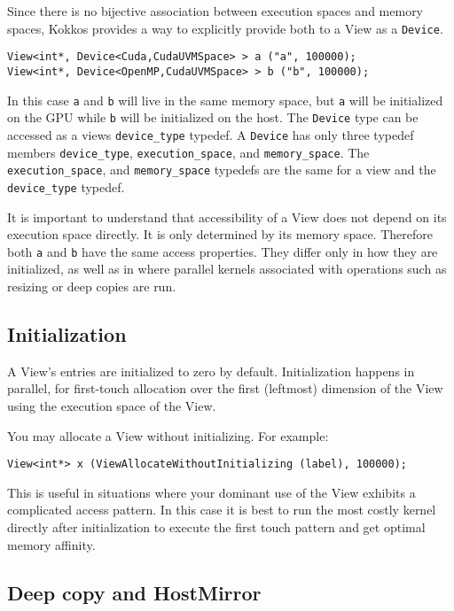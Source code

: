 Since there is no bijective association between execution spaces and memory 
spaces, Kokkos provides a way to explicitly provide both to a View as a 
\lstinline|Device|. 
\begin{lstlisting}
View<int*, Device<Cuda,CudaUVMSpace> > a ("a", 100000);
View<int*, Device<OpenMP,CudaUVMSpace> > b ("b", 100000);
\end{lstlisting}
In this case \lstinline|a| and \lstinline|b| will live in the same memory space,
but \lstinline|a| will be initialized on the GPU while \lstinline|b| will be 
initialized on the host. 
The \lstinline|Device| type can be accessed as a views \lstinline|device_type|
typedef. A \lstinline|Device| has only three typedef members 
\lstinline|device_type|, \lstinline|execution_space|, and \lstinline|memory_space|.
The \lstinline|execution_space|, and \lstinline|memory_space| typedefs are
the same for a view and the \lstinline|device_type| typedef.

It is important to understand that accessibility of a View does not 
depend on its execution space directly. It is only determined by its
memory space. Therefore both \lstinline|a| and \lstinline|b| have the 
same access properties. They differ only in how they are initialized, 
as well as in where parallel kernels associated with operations such 
as resizing or deep copies are run. 

\subsection{Initialization}

A View's entries are initialized to zero by default.  Initialization
happens in parallel, for first-touch allocation over the first
(leftmost) dimension of the View using the execution space
of the View. 

You may allocate a View without initializing.  For example:
\begin{lstlisting}
View<int*> x (ViewAllocateWithoutInitializing (label), 100000);
\end{lstlisting}
This is useful in situations where your dominant use of the View
exhibits a complicated access pattern. In this case it is best
to run the most costly kernel directly after initialization to 
execute the first touch pattern and get optimal memory affinity.

\subsection{Deep copy and HostMirror}

